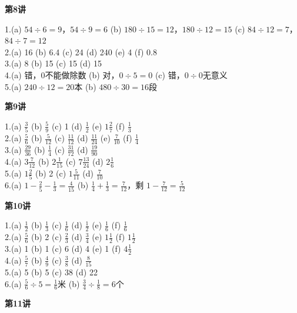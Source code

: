 \textbf{第8讲}

1.(a) $54\div6=9$，$54\div9=6$ \quad (b) $180\div15=12$，$180\div12=15$ \quad (c) $84\div12=7$，$84\div7=12$\\
2.(a) 16 \quad (b) 6.4 \quad (c) 24 \quad (d) 240 \quad (e) 4 \quad (f) 0.8\\
3.(a) 8 \quad (b) 15 \quad (c) 15 \quad (d) 15\\
4.(a) 错，0不能做除数 \quad (b) 对，$0\div5=0$ \quad (c) 错，$0\div0$无意义\\
5.(a) $240\div12=20$本 \quad (b) $480\div30=16$段

\textbf{第9讲}

1.(a) $\frac35$ \quad (b) $\frac59$ \quad (c) 1 \quad (d) $\frac12$ \quad (e) $1\frac27$ \quad (f) $\frac13$\\
2.(a) $\frac56$ \quad (b) $\frac{5}{12}$ \quad (c) $\frac{11}{12}$ \quad (d) $\frac{11}{24}$ \quad (e) $\frac{7}{10}$ \quad (f) $\frac14$\\
3.(a) $\frac{29}{36}$ \quad (b) $\frac14$ \quad (c) $\frac{31}{72}$ \quad (d) $\frac{19}{90}$\\
4.(a) $3\frac{7}{12}$ \quad (b) $2\frac{1}{15}$ \quad (c) $7\frac{13}{24}$ \quad (d) $2\frac16$\\
5.(a) $1\frac25$ \quad (b) 2 \quad (c) $1\frac{5}{11}$ \quad (d) $\frac{7}{10}$\\
6.(a) $1-\frac25-\frac13 = \frac{4}{15}$ \quad (b) $\frac14+\frac13=\frac{7}{12}$，剩 $1-\frac{7}{12}=\frac{5}{12}$

\textbf{第10讲}

1.(a) $\frac12$ \quad (b) $\frac13$ \quad (c) $\frac16$ \quad (d) $\frac12$ \quad (e) $\frac16$ \quad (f) $\frac16$\\
2.(a) $\frac56$ \quad (b) 2 \quad (c) $\frac23$ \quad (d) $\frac34$ \quad (e) $1\frac12$ \quad (f) $1\frac12$\\
3.(a) 1 \quad (b) 1 \quad (c) 6 \quad (d) 4 \quad (e) 1 \quad (f) $4\frac12$\\
4.(a) $\frac57$ \quad (b) $\frac49$ \quad (c) $\frac38$ \quad (d) $\frac{8}{15}$\\
5.(a) 5 \quad (b) 5 \quad (c) 38 \quad (d) 22\\
6.(a) $\frac56\div5=\frac16$米 \quad (b) $\frac34\div\frac18=6$个

\textbf{第11讲}

